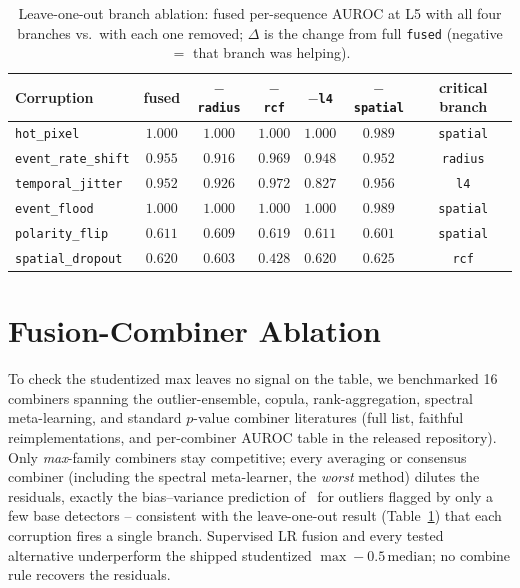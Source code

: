 ﻿\documentclass{article} %
\theoremstyle{remark}
\begin{document}
\begin{table}[t]
  \centering\small
  \caption{Leave-one-out branch ablation: fused per-sequence AUROC at L5 with all four
  branches vs.\ with each one removed; $\Delta$ is the change from full \texttt{fused}
  (negative $=$ that branch was helping).}
  \label{tab:mdd-loo}
  \begin{tabular}{lcccccc}
    \toprule
    Corruption & \textbf{fused} & $-$\texttt{radius} & $-$\texttt{rcf} & $-$\texttt{l4} & $-$\texttt{spatial} & critical branch \\
    \midrule
    \texttt{hot\_pixel}        & $1.000$ & $1.000$ & $1.000$ & $1.000$ & $0.989$ & \texttt{spatial} \\
    \texttt{event\_rate\_shift}& $0.955$ & $\mathbf{0.916}$ & $0.969$ & $0.948$ & $0.952$ & \texttt{radius} \\
    \texttt{temporal\_jitter}  & $0.952$ & $0.926$ & $0.972$ & $\mathbf{0.827}$ & $0.956$ & \texttt{l4} \\
    \texttt{event\_flood}      & $1.000$ & $1.000$ & $1.000$ & $1.000$ & $0.989$ & \texttt{spatial} \\
    \texttt{polarity\_flip}    & $0.611$ & $0.609$ & $0.619$ & $0.611$ & $\mathbf{0.601}$ & \texttt{spatial} \\
    \texttt{spatial\_dropout}  & $0.620$ & $0.603$ & $\mathbf{0.428}$ & $0.620$ & $0.625$ & \texttt{rcf} \\
    \bottomrule
  \end{tabular}
\end{table}

\section{Fusion-Combiner Ablation}
\label{app:fusion}
To check the studentized max leaves no signal on the table, we benchmarked 16 combiners spanning
the outlier-ensemble, copula, rank-aggregation, spectral meta-learning, and standard $p$-value
combiner literatures (full list, faithful reimplementations, and per-combiner AUROC table in the
released repository). Only \emph{max}-family combiners stay competitive; every averaging or
consensus combiner (including the spectral meta-learner, the \emph{worst} method) dilutes the
residuals, exactly the bias--variance prediction of~\citet{aggarwal2015ensembles} for outliers
flagged by only a few base detectors -- consistent with the leave-one-out result
(Table~\ref{tab:mdd-loo}) that each corruption fires a single branch. Supervised LR fusion and every
tested alternative underperform the shipped studentized $\max-0.5\,\mathrm{median}$; no combine rule
recovers the residuals.
\end{document}
